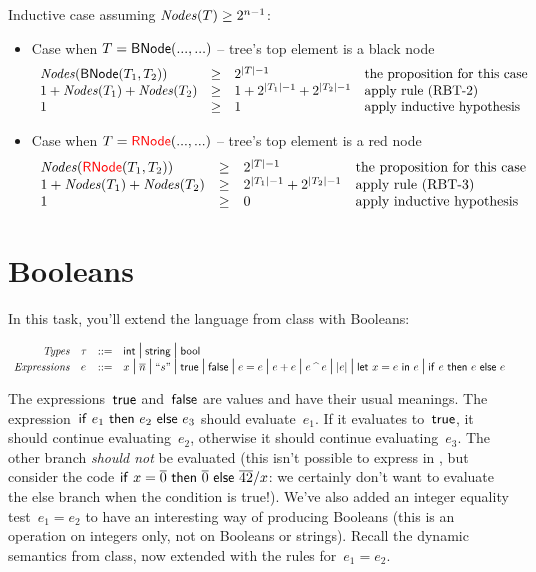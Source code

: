 \documentclass{article}
\begin{document}
Inductive case assuming $\mathit{Nodes}(T) \geq 2^{n-1}$:
\begin{itemize}
    \item Case when $T = \mathsf{BNode}(..., ...)$ -- tree's top element is a black node
        \[
        \begin{array}{l l l l}
            \mathit{Nodes}(\mathsf{BNode}(T_1, T_2)) & \geq & 2^{|T|-1} & \text{the proposition for this case}\\
            1 + \mathit{Nodes}(T_1) + \mathit{Nodes}(T_2) & \geq & 1 + 2 ^ {|T_1| - 1} + 2 ^ {|T_2| - 1} & \text{apply rule (RBT-2)}\\
            1 & \geq & 1  & \text{apply inductive hypothesis}\\
        \end{array}
        \]
    
    \item Case when $T = {\color{red}{\mathsf{RNode}}}(..., ...)$ -- tree's top element is a red node
        \[
        \begin{array}{l l l l}
            \mathit{Nodes}({\color{red}{\mathsf{RNode}}}(T_1, T_2)) & \geq & 2^{|T|-1} & \text{the proposition for this case}\\
            1 + \mathit{Nodes}(T_1) + \mathit{Nodes}(T_2) & \geq & 2 ^ {|T_1| - 1} + 2 ^ {|T_2| - 1} & \text{apply rule (RBT-3)}\\
            1 & \geq & 0  & \text{apply inductive hypothesis}\\
        \end{array}
        \]
\end{itemize}

\section{Booleans}

In this task, you'll extend the {\Elang} language from class with Booleans:

\[
\begin{array}{r l l l}
  \mathit{Types} & \tau & \mathop{::=} &
  \mathsf{int} \mbox{\Large $\,\mid\,$} \mathsf{string} \mbox{\Large $\,\mid\,$} \mathsf{bool}\\
  \mathit{Expressions} & e & \mathop{::=} &
  x \mbox{\Large $\,\mid\,$}
  \overline{n} \mbox{\Large $\,\mid\,$}
  \text{``}s\text{''} \mbox{\Large $\,\mid\,$}
  \mathsf{true} \mbox{\Large $\,\mid\,$}
  \mathsf{false} \mbox{\Large $\,\mid\,$}
  e = e \mbox{\Large $\,\mid\,$}
  e + e \mbox{\Large $\,\mid\,$}
  e \mathbin{\text{\textasciicircum}} e \mbox{\Large $\,\mid\,$}
  |e| \mbox{\Large $\,\mid\,$}
  \mathsf{let}~x=e~\mathsf{in}~e \mbox{\Large $\,\mid\,$}
  \mathsf{if}~e~\mathsf{then}~e~\mathsf{else}~e
\end{array}
\]

The expressions~$\mathsf{true}$ and~$\mathsf{false}$ are values and have their usual
meanings.
%
The expression~$\mathsf{if}~e_1~\mathsf{then}~e_2~\mathsf{else}~e_3$ should evaluate~$e_1$. If it evaluates
to~$\mathsf{true}$, it should continue evaluating~$e_2$, otherwise it should
continue evaluating~$e_3$.
%
The other branch {\em should not} be evaluated (this isn't possible to express
in {\Elang}, but consider the code $\mathsf{if}~x = \overline{0}~\mathsf{then}~\overline{0}~\mathsf{else}~\overline{42} / x$: we certainly
don't want to evaluate the else branch when the condition is true!).
%
We've also added an integer equality test~$e_1 = e_2$ to have an interesting
way of producing Booleans (this is an operation on integers only, not on
Booleans or strings).
%
Recall the dynamic semantics from class, now extended with the rules
for~$e_1 = e_2$.
\end{document}
